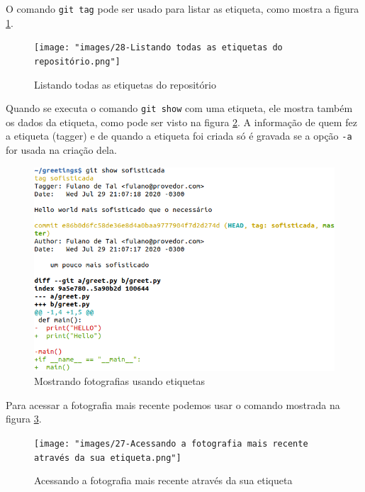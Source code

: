 \documentclass[a4paper]{book}
\begin{document}
O comando \texttt{git tag} pode ser usado para listar as
etiqueta, como mostra a figura \ref{fig:28}.

\begin{figure}[!h]
\caption{Listando todas as etiquetas do repositório}
\label{fig:28}
\centering
\texttt{[image: "images/28-Listando todas as etiquetas do repositório.png"]}
\end{figure}


Quando se executa o comando \texttt{git show} com uma etiqueta,
ele mostra também os dados da etiqueta, como pode ser visto na
figura \ref{fig:24}.
A informação de quem fez a etiqueta (tagger) e de quando 
a etiqueta foi criada só é gravada se a opção \texttt{-a}
for usada na criação dela.

\begin{figure}[!h]
\caption{Mostrando fotografias usando etiquetas}
\label{fig:24}
\centering
\includegraphics[scale=0.6,left]{"images/24-Mostrando fotografias usando etiquetas.png"}
\end{figure}


Para acessar a fotografia mais recente podemos usar o 
comando mostrada na figura \ref{fig:27}.

\begin{figure}[ht]
\caption{Acessando a fotografia mais recente através da sua etiqueta}
\label{fig:27}
\centering
\texttt{[image: "images/27-Acessando a fotografia mais recente através da sua etiqueta.png"]}
\end{figure}
\end{document}
